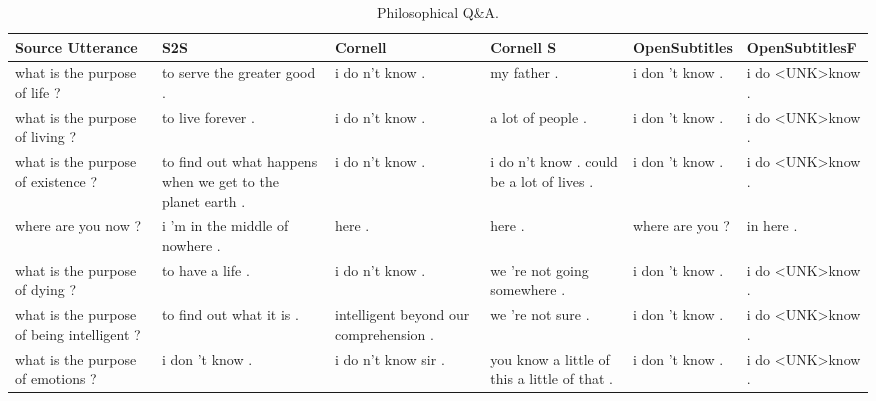 \documentclass[12pt]{article}
\begin{document}
\begin{table}[H]
	\centering
	\begin{tabular}{|L{2.3cm}|L{2.3cm}|L{2.3cm}|L{2.3cm}|L{2.3cm}|L{2.3cm}|}
		\hline
		\textbf{Source Utterance} & \textbf{S2S} & \textbf{Cornell} & \textbf{Cornell S} & \textbf{OpenSubtitles} & \textbf{OpenSubtitlesF}\\ \hline
		what is the purpose of life ? & to serve the greater good . & i do n't know . & my father . & i don 't know . & i do \textless UNK\textgreater know .
		\\ \hline
		what is the purpose of living ? & to live forever . & i do n't know . & a lot of people . & i don 't know . & i do \textless UNK\textgreater know .
		\\ \hline
		what is the purpose of existence ? & to find out what happens when we get to the planet earth . & i do n't know . & i do n't know . could be a lot of lives . & i don 't know . & i do \textless UNK\textgreater know .
		\\ \hline
		where are you now ? & i ’m in the middle of nowhere . & here . & here . & where are you ? & in here .
		\\ \hline
		what is the purpose of dying ? & to have a life . & i do n't know . & we 're not going somewhere . & i don 't know . & i do \textless UNK\textgreater know .
		\\ \hline
		what is the purpose of being intelligent ? & to find out what it is . & intelligent beyond our comprehension .  & we 're not sure . & i don 't know . & i do \textless UNK\textgreater know .
		\\ \hline
		what is the purpose of emotions ? & i don ’t know . & i do n't know sir .  & you know a little of this a little of that . & i don 't know . & i do \textless UNK\textgreater know .
		\\ \hline
		
	\end{tabular}
	\caption{Philosophical Q\&A.}	
	\label{table:philosophicalNCM}
\end{table}
\end{document}
